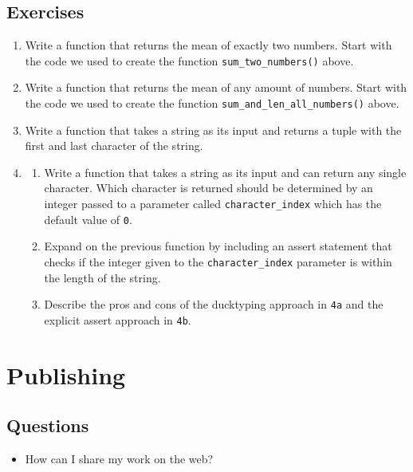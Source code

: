\documentclass[]{Nemilov}
\providecommand{\tightlist}{%
  \setlength{\itemsep}{0pt}\setlength{\parskip}{0pt}}
\begin{document}
\hypertarget{py-dev-exercises}{%
\section{Exercises}\label{py-dev-exercises}}

\begin{enumerate}
\def\labelenumi{\arabic{enumi}.}
\item
  Write a function that returns the mean of exactly two numbers. Start with
  the code we used to create the function \texttt{sum\_two\_numbers()} above.
\item
  Write a function that returns the mean of any amount of numbers. Start with
  the code we used to create the function \texttt{sum\_and\_len\_all\_numbers()} above.
\item
  Write a function that takes a string as its input and returns a tuple with
  the first and last character of the string.
\item
  \begin{enumerate}
  \def\labelenumii{\alph{enumii}.}
  \tightlist
  \item
    Write a function that takes a string as its input and can return any
    single character. Which character is returned should be determined by
    an integer passed to a parameter called \texttt{character\_index} which has the
    default value of \texttt{0}.
  \item
    Expand on the previous function by including an assert statement that
    checks if the integer given to the \texttt{character\_index} parameter is within
    the length of the string.
  \item
    Describe the pros and cons of the ducktyping approach in \texttt{4a} and the
    explicit assert approach in \texttt{4b}.
  \end{enumerate}
\end{enumerate}

\hypertarget{py-publishing}{%
\chapter{Publishing}\label{py-publishing}}

\hypertarget{py-publishing-questions}{%
\section{Questions}\label{py-publishing-questions}}

\begin{itemize}
\tightlist
\item
  How can I share my work on the web?
\end{itemize}
\end{document}
